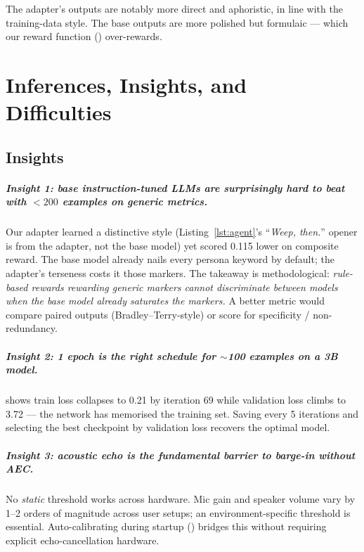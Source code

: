\documentclass{ecsproject}
\begin{document}
The adapter's outputs are notably more direct and aphoristic, in line
with the training-data style. The base outputs are more polished but
formulaic --- which our reward function () over-rewards.

\chapter{Inferences, Insights, and Difficulties}
\label{Chapter:Insights}

\section{Insights}

\paragraph{Insight 1: base instruction-tuned LLMs are surprisingly hard to beat with $<\!200$ examples on generic metrics.}
Our adapter learned a distinctive style (Listing~\ref{lst:agent}'s
``\emph{Weep, then.}'' opener is from the adapter, not the base model)
yet scored 0.115 lower on composite reward. The base model already
nails every persona keyword by default; the adapter's terseness costs
it those markers. The takeaway is methodological: \emph{rule-based
rewards rewarding generic markers cannot discriminate between models
when the base model already saturates the markers.} A better metric
would compare paired outputs (Bradley--Terry-style) or score for
specificity / non-redundancy.

\paragraph{Insight 2: 1 epoch is the right schedule for $\sim$100 examples on a 3B model.}
 shows train loss collapses to 0.21 by iteration 69
while validation loss climbs to 3.72 --- the network has memorised
the training set. Saving every 5 iterations and selecting the best
checkpoint by validation loss recovers the optimal model.

\paragraph{Insight 3: acoustic echo is the fundamental barrier to barge-in without AEC.}
No \emph{static} threshold works across hardware. Mic gain and
speaker volume vary by 1--2 orders of magnitude across user setups;
an environment-specific threshold is essential. Auto-calibrating
during startup () bridges this without requiring
explicit echo-cancellation hardware.
\end{document}
